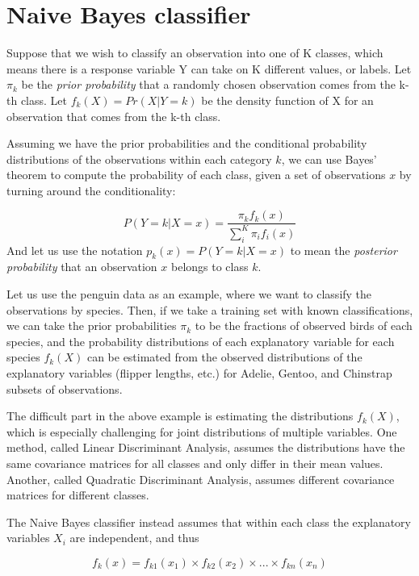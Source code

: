 \documentclass[
  letterpaper,
  DIV=11,
  numbers=noendperiod]{scrreprt}
\begin{document}
\hypertarget{naive-bayes-classifier}{%
\section{Naive Bayes classifier}\label{naive-bayes-classifier}}

Suppose that we wish to classify an observation into one of K classes,
which means there is a response variable Y can take on K different
values, or labels. Let \(π_k\) be the \emph{prior probability} that a
randomly chosen observation comes from the k-th class. Let
\(f_k(X) =Pr(X|Y = k)\) be the density function of X for an observation
that comes from the k-th class.

Assuming we have the prior probabilities and the conditional probability
distributions of the observations within each category \(k\), we can use
Bayes' theorem to compute the probability of each class, given a set of
observations \(x\) by turning around the conditionality:

\[
P(Y = k | X = x) = \frac{\pi_k f_k(x)}{\sum_i^K \pi_i f_i(x)}
\] And let us use the notation \(p_k (x) = P(Y = k | X = x)\) to mean
the \emph{posterior probability} that an observation \(x\) belongs to
class \(k\).

Let us use the penguin data as an example, where we want to classify the
observations by species. Then, if we take a training set with known
classifications, we can take the prior probabilities \(\pi_k\) to be the
fractions of observed birds of each species, and the probability
distributions of each explanatory variable for each species \(f_k(X)\)
can be estimated from the observed distributions of the explanatory
variables (flipper lengths, etc.) for Adelie, Gentoo, and Chinstrap
subsets of observations.

The difficult part in the above example is estimating the distributions
\(f_k(X)\), which is especially challenging for joint distributions of
multiple variables. One method, called Linear Discriminant Analysis,
assumes the distributions have the same covariance matrices for all
classes and only differ in their mean values. Another, called Quadratic
Discriminant Analysis, assumes different covariance matrices for
different classes.

The Naive Bayes classifier instead assumes that within each class the
explanatory variables \(X_i\) are independent, and thus

\[
f_k(x) = f_{k1} (x_1) \times f_{k2} (x_2) \times ... \times f_{kn} (x_n)
\]
\end{document}
